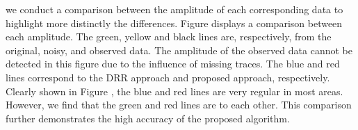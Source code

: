 
 we conduct a comparison between the amplitude of each corresponding data  to highlight more distinctly the differences. Figure \dlo{\ref{7}}\wen{\ref{synth-ss}} displays a comparison between each amplitude. The green, yellow and black lines are, respectively, from the original, noisy, and observed data. The amplitude of the observed data cannot be detected in this figure due to the influence of missing traces. The blue and red lines correspond to the DRR approach and proposed approach, respectively. Clearly shown in Figure \dlo{\ref{7}}\wen{\ref{synth-ss}}, the blue and red lines are very regular in most areas. However, we find that the green and red lines are   to each other. This comparison further demonstrates the high accuracy of the proposed algorithm.

